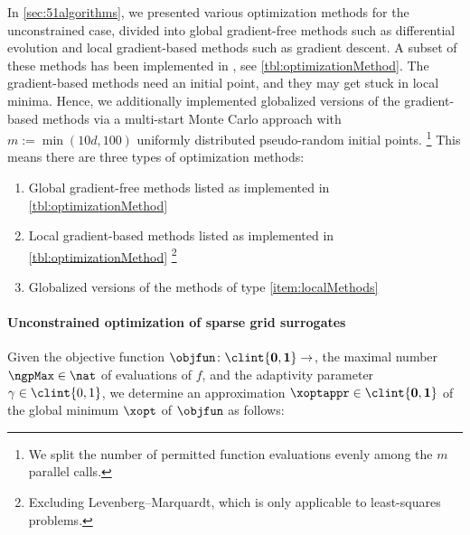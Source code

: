 In \cref{sec:51algorithms}, we presented various optimization methods
for the unconstrained case,
divided into global gradient-free methods such as differential evolution and
local gradient-based methods such as gradient descent.
A subset of these methods has been implemented in \sgpp{}
\cite{Pflueger10Spatially}, see \cref{tbl:optimizationMethod}.
The gradient-based methods need an initial point, and
they may get stuck in local minima.
Hence, we additionally implemented globalized versions
of the gradient-based methods
via a multi-start Monte Carlo approach with $m := \min(10d, 100)$
uniformly distributed pseudo-random initial points.%
\footnote{%
  We split the number of permitted function evaluations evenly
  among the $m$ parallel calls.%
}
This means there are three types of optimization methods:

\begin{enumerate}[label={(T\arabic*)},leftmargin=*]
  \item
  \label{item:globalMethods}
  Global gradient-free methods listed as implemented in
  \cref{tbl:optimizationMethod}
  
  \item
  \label{item:localMethods}
  Local gradient-based methods listed as implemented in
  \cref{tbl:optimizationMethod}%
  \footnote{%
     Excluding Levenberg--Marquardt, which is only applicable
     to least-squares problems.%
  }
  
  \item
  \label{item:globalizedMethods}
  Globalized versions of the methods of type \ref{item:localMethods}
\end{enumerate}

\paragraph{Unconstrained optimization of sparse grid surrogates}

Given the objective function $\objfun\colon \clint{\*0, \*1} \to \real$,
the maximal number $\ngpMax \in \nat$ of evaluations of $f$, and
the adaptivity parameter $\gamma \in \clint{0, 1}$,
we determine an approximation $\xoptappr \in \clint{\*0, \*1}$
of the global minimum $\xopt$ of $\objfun$ as follows:

